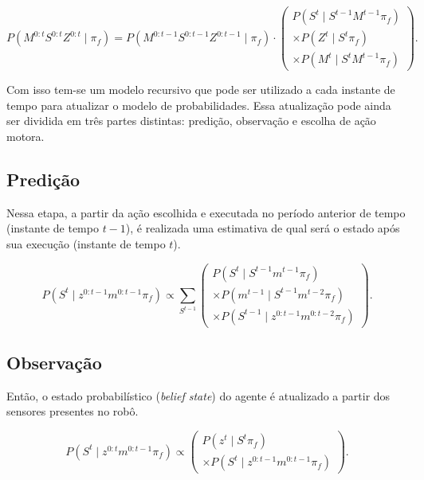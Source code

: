 \begin{equation} \label{equation:FiltroBayesiano1Recursivo}
        P ( M^{0: t} S^{0: t} Z^{0: t} \mid \pi_f ) = P ( M^{0: t-1} S^{0: t-1} Z^{0: t-1} \mid \pi_f ) \cdot 
        \left(
            \begin{array}{l}
                P( S^t \mid S^{t -1} M^{t -1} \pi_f ) \\
                \times P( Z^t \mid S^t \pi_f ) \\
                \times P( M^t \mid S^t M^{t -1} \pi_f )
            \end{array}
        \right).
\end{equation}

Com isso tem-se um modelo recursivo que pode ser utilizado a cada instante de tempo para atualizar o modelo de probabilidades. Essa atualização pode ainda ser dividida em três partes distintas: predição, observação e escolha de ação motora.

\subsection{Predição}

Nessa etapa, a partir da ação escolhida e executada no período anterior de tempo (instante de tempo $ t-1 $), é realizada uma estimativa de qual será o estado após sua execução (instante de tempo $ t $).

\begin{equation}
    P \left( S^t \mid z^{0: t-1} m^{0: t-1} \pi_f \right) \propto \sum\limits_{S^{t-1}}
        \left(
            \begin{array}{l}
                P \left( S^t \mid S^{t-1} m^{t-1} \pi_f \right) \\
                \times P \left( m^{t-1} \mid S^{t-1} m^{t-2} \pi_f \right)\\
                \times P \left( S^{t-1} \mid z^{0: t-1} m^{0: t-2} \pi_f \right)
            \end{array}
        \right).
\end{equation}


\subsection{Observação}

Então, o estado probabilístico (\textit{belief state}) do agente é atualizado a partir dos sensores presentes no robô.

\begin{equation}
    P \left( S^t \mid z^{0: t} m^{0: t-1} \pi_f \right) \propto 
        \left(
            \begin{array}{l}
                P \left( z^t \mid S^t \pi_f \right) \\
                \times P \left( S^t \mid z^{0: t-1} m^{0: t-1} \pi_f \right)
            \end{array}
        \right).
\end{equation}


